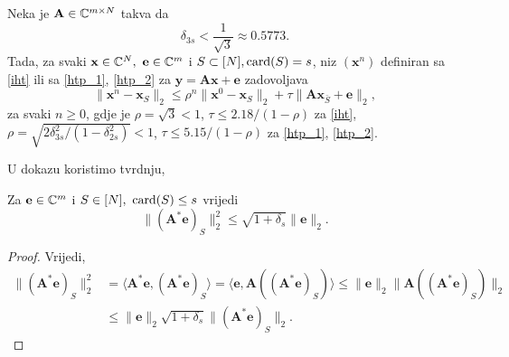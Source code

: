 \documentclass[a4paper,twoside,12pt]{memoir} %
\newcommand{\vect}[1]{\mathbf{#1}}
\renewcommand{\vec}{\vect}
\newcommand{\card}{\text{\normalfont{card}}}
\newcommand{\norm}[1]{\|{#1}\|}
\begin{document}
\begin{thm}\label{tm:6:18}
    Neka je $\vec A \in \C^{m \times N}$ takva da
    \begin{equation}\label{6:28}
        \delta_{3s} < \frac{1}{\sqrt{3}} \approx 0.5773.
    \end{equation}
    Tada, za svaki $\vec x \in \C^{N},\ \vec e \in \C^m$ i $S \subset [N], \card(S) = s$, niz $(\vec x^n)$ definiran sa \eqref{iht} ili sa \eqref{htp_1}, \eqref{htp_2} za $\vec y = \vec{Ax}+ \vec e$ zadovoljava
    \begin{equation}\label{6:29}
        \norm{\vec x^n - \vec x_S}_2 \leq \rho^n \norm{\vec x^0 - \vec x_S}_2 + \tau \norm{\vec{Ax}_{\bar S} + \vec e}_2, 
    \end{equation}
    za svaki $n \geq 0$, gdje je $\rho = \sqrt{3} < 1$, $\tau \leq 2.18/(1-\rho)$ za \eqref{iht}, $\rho = \sqrt{2 \delta^2_{3s}/(1-\delta_{2s}^2)} < 1$, $\tau \leq 5.15 / (1- \rho)$ za \eqref{htp_1}, \eqref{htp_2}.
\end{thm}
U dokazu koristimo tvrdnju,
\begin{lem}\label{lem:6:20}
    Za $\vec e \in \C^m$ i $S \in [N],\ \card(S) \leq s$ vrijedi 
    \begin{equation*}
        \norm{(\vec A^* \vec e)_S}_2^2 \leq \sqrt{1+\delta_s}\norm{\vec e}_2.
    \end{equation*}
\end{lem}
\begin{proof}
    Vrijedi,
    \begin{align*}
        \norm{(\vec A^* \vec e)_S}_2^2 &= \langle \vec A^* \vec e, (\vec A^* \vec e)_S  \rangle = \langle \vec e, \vec A ((\vec A^* \vec e)_S)\rangle \leq \norm{\vec e}_2 \norm{\vec A ((\vec A^* \vec e)_S)}_2\\
        &\leq \norm{\vec e}_2 \sqrt{1+\delta_s} \norm{(\vec A^* \vec e)_S}_2.
    \end{align*}
\end{proof}
\end{document}
